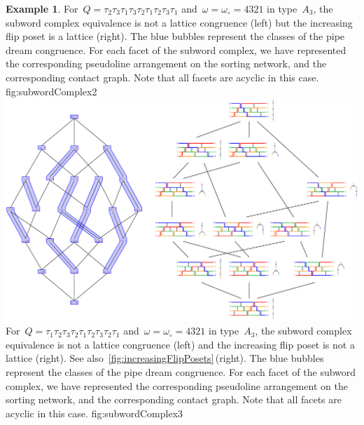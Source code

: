 \documentclass[reqno]{amsart}
\theoremstyle{definition}
\newtheorem{example}[theorem]{Example}
\newcommand{\wo}{\omega_\circ} %
\begin{document}
\begin{example}
{For~$Q = \tau_2 \tau_3 \tau_1 \tau_3 \tau_2 \tau_1 \tau_2 \tau_3 \tau_1$ and~$\omega = \wo = 4321$ in type~$A_3$, the subword complex equivalence is not a lattice congruence (left) but the increasing flip poset is a lattice (right). The blue bubbles represent the classes of the pipe dream congruence. For each facet of the subword complex, we have represented the corresponding pseudoline arrangement on the sorting network, and the corresponding contact graph. Note that all facets are acyclic in this case.}
{fig:subwordComplex2}
%
{\includegraphics[scale=.7]{subwordComplex3}}
{For~$Q = \tau_1 \tau_2 \tau_3 \tau_2 \tau_1 \tau_2 \tau_3 \tau_2 \tau_1$ and~$\omega = \wo = 4321$ in type~$A_3$, the subword complex equivalence is not a lattice congruence (left) and the increasing flip poset is not a lattice (right). See also~\cref{fig:increasingFlipPosets}\,(right). The blue bubbles represent the classes of the pipe dream congruence. For each facet of the subword complex, we have represented the corresponding pseudoline arrangement on the sorting network, and the corresponding contact graph. Note that all facets are acyclic in this case.}
{fig:subwordComplex3}
\end{example}
\end{document}
